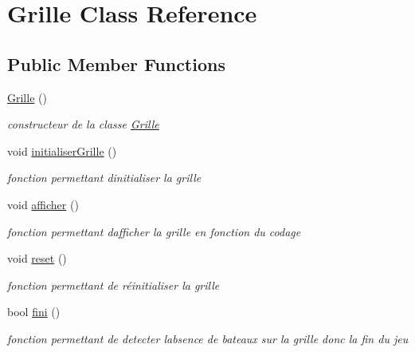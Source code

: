 \hypertarget{class_grille}{}\section{Grille Class Reference}
\label{class_grille}
\subsection*{Public Member Functions}
\begin{DoxyCompactItemize}
\item 
\mbox{\label{class_grille_a8a15d40f4706c34fb2f75d9289f9f615}} 
\mbox{\hyperlink{class_grille_a8a15d40f4706c34fb2f75d9289f9f615}{Grille}} ()
\begin{DoxyCompactList}\small\item\em constructeur de la classe \mbox{\hyperlink{class_grille}{Grille}} \end{DoxyCompactList}\item 
\mbox{\label{class_grille_ab7bdedc97b08bfb40ed00d7e995d7e44}} 
void \mbox{\hyperlink{class_grille_ab7bdedc97b08bfb40ed00d7e995d7e44}{initialiser\+Grille}} ()
\begin{DoxyCompactList}\small\item\em fonction permettant d\textquotesingle{}initialiser la grille \end{DoxyCompactList}\item 
\mbox{\label{class_grille_a22474eed2d2c31ec1cb53e44095eed69}} 
void \mbox{\hyperlink{class_grille_a22474eed2d2c31ec1cb53e44095eed69}{afficher}} ()
\begin{DoxyCompactList}\small\item\em fonction permettant d\textquotesingle{}afficher la grille en fonction du codage \end{DoxyCompactList}\item 
\mbox{\label{class_grille_a17d8b9233b4d7fe24fe5e0c4809674e7}} 
void \mbox{\hyperlink{class_grille_a17d8b9233b4d7fe24fe5e0c4809674e7}{reset}} ()
\begin{DoxyCompactList}\small\item\em fonction permettant de réinitialiser la grille \end{DoxyCompactList}\item 
\mbox{\label{class_grille_af22b526602ad163f6e6f7f7c8f486aa2}} 
bool \mbox{\hyperlink{class_grille_af22b526602ad163f6e6f7f7c8f486aa2}{fini}} ()
\begin{DoxyCompactList}\small\item\em fonction permettant de detecter l\textquotesingle{}absence de bateaux sur la grille donc la fin du jeu \end{DoxyCompactList}\end{DoxyCompactItemize}
